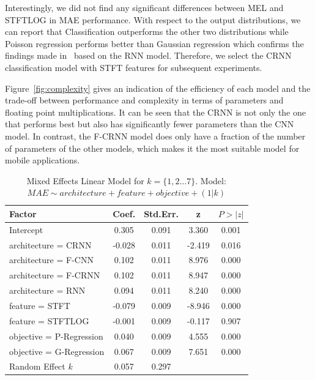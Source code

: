 Interestingly, we did not find any significant differences between MEL and STFTLOG in MAE performance.
With respect to the output distributions, we can report that Classification outperforms the other two distributions while Poisson regression performs better than Gaussian regression which confirms the findings made in~\cite{stoeter17} based on the RNN model.
Therefore, we select the CRNN classification model with STFT features for subsequent experiments.
\par
Figure~\ref{fig:complexity} gives an indication of the efficiency of each model and the trade-off between performance and complexity in terms of parameters and floating point multiplications.
It can be seen that the CRNN is not only the one that performs best but also has significantly fewer parameters than the CNN model.
In contrast, the F-CRNN model does only have a fraction of the number of parameters of the other models, which makes it the most suitable model for mobile applications.

\begin{table}[t]
\caption{Mixed Effects Linear Model for \(k = \{1, 2\dots7\}\). Model: \(MAE \sim architecture + feature + objective + (1|k)\)}
\begin{center}
\begin{tabular}{lcccc}
\toprule
Factor                    & Coef.  & Std.Err. &   z    & \(P>|z|\) \\
\midrule
Intercept                      &  0.305 &    0.091 &  3.360 &       0.001 \\
architecture = CRNN            & -0.028 &    0.011 & -2.419 &       0.016 \\
architecture = F-CNN           &  0.102 &    0.011 &  8.976 &       0.000 \\
architecture = F-CRNN          &  0.102 &    0.011 &  8.947 &       0.000 \\
architecture = RNN             &  0.094 &    0.011 &  8.240 &       0.000 \\
feature = STFT                 & -0.079 &    0.009 & -8.946 &       0.000 \\
feature = STFTLOG              & -0.001 &    0.009 & -0.117 &       0.907 \\
objective = P-Regression       &  0.040 &    0.009 &  4.555 &       0.000 \\
objective = G-Regression       &  0.067 &    0.009 &  7.651 &       0.000 \\
Random Effect \(k\)            &  0.057 &    0.297 &        &             \\
\bottomrule
\end{tabular}
\end{center}%
\label{tab:mixedmodel1}
\end{table}


